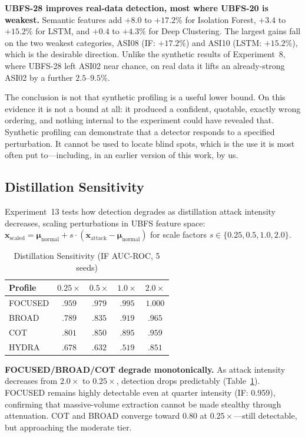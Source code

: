 \documentclass[conference]{IEEEtran}
\begin{document}
\textbf{UBFS-28 improves real-data detection, most where UBFS-20 is weakest.} Semantic features add $+8.0$ to $+17.2\%$ for Isolation Forest, $+3.4$ to $+15.2\%$ for LSTM, and $+0.4$ to $+4.3\%$ for Deep Clustering. The largest gains fall on the two weakest categories, ASI08 (IF: $+17.2\%$) and ASI10 (LSTM: $+15.2\%$), which is the desirable direction. Unlike the synthetic results of Experiment~8, where UBFS-28 left ASI02 near chance, on real data it lifts an already-strong ASI02 by a further $2.5$--$9.5\%$.

The conclusion is not that synthetic profiling is a useful lower bound. On this evidence it is not a bound at all: it produced a confident, quotable, exactly wrong ordering, and nothing internal to the experiment could have revealed that. Synthetic profiling can demonstrate that a detector responds to a specified perturbation. It cannot be used to locate blind spots, which is the use it is most often put to---including, in an earlier version of this work, by us.

\subsection{Distillation Sensitivity}
\label{sec:sensitivity}

Experiment~13 tests how detection degrades as distillation attack intensity decreases, scaling perturbations in UBFS feature space: $\mathbf{x}_{\text{scaled}} = \boldsymbol{\mu}_{\text{normal}} + s \cdot (\mathbf{x}_{\text{attack}} - \boldsymbol{\mu}_{\text{normal}})$ for scale factors $s \in \{0.25, 0.5, 1.0, 2.0\}$.

\begin{table}[htbp]
\caption{Distillation Sensitivity (IF AUC-ROC, 5 seeds)}
\label{tab:sensitivity}
\centering
\begin{tabular}{lcccc}
\toprule
\textbf{Profile} & $\mathbf{0.25\times}$ & $\mathbf{0.5\times}$ & $\mathbf{1.0\times}$ & $\mathbf{2.0\times}$ \\
\midrule
FOCUSED & $.959$ & $.979$ & $.995$ & $1.000$ \\
BROAD & $.789$ & $.835$ & $.919$ & $.965$ \\
COT & $.801$ & $.850$ & $.895$ & $.959$ \\
HYDRA & $.678$ & $.632$ & $.519$ & $.851$ \\
\bottomrule
\end{tabular}
\end{table}

\textbf{FOCUSED/BROAD/COT degrade monotonically.} As attack intensity decreases from $2.0\times$ to $0.25\times$, detection drops predictably (Table~\ref{tab:sensitivity}). FOCUSED remains highly detectable even at quarter intensity (IF: 0.959), confirming that massive-volume extraction cannot be made stealthy through attenuation. COT and BROAD converge toward 0.80 at $0.25\times$---still detectable, but approaching the moderate tier.
\end{document}
